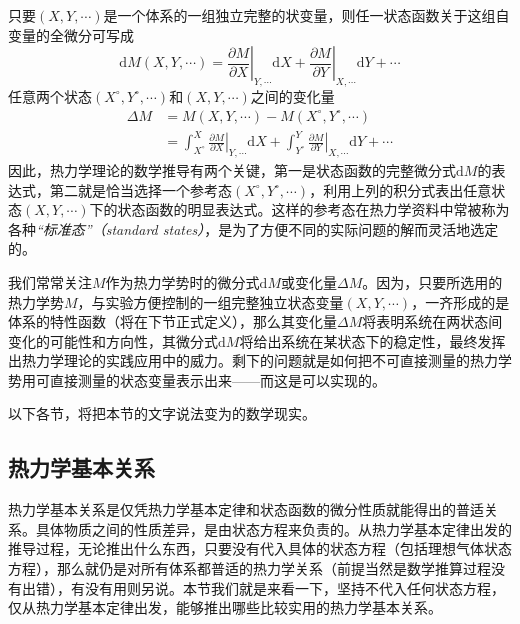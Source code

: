 \documentclass[main.tex]{subfiles}
\begin{document}
只要$\left(X,Y,\cdots\right)$是一个体系的一组独立完整的状变量，则任一状态函数关于这组自变量的全微分可写成
\[\mathrm{d}M\left(X,Y,\cdots\right)=\left.\frac{\partial M}{\partial X}\right|_{Y,\cdots}\mathrm{d}X+\left.\frac{\partial M}{\partial Y}\right|_{X,\cdots}\mathrm{d}Y+\cdots\]
任意两个状态$\left(X^\circ,Y^\circ,\cdots\right)$和$\left(X,Y,\cdots\right)$之间的变化量
\begin{equation}\label{eq:I.1_integral_of_function}
  \begin{aligned}
    \Delta M & =M\left(X,Y,\cdots\right)-M\left(X^\circ,Y^\circ,\cdots\right)                                                                                                                \\
             & =\int_{X^\circ}^{X}\left.\frac{\partial M}{\partial X}\right|_{Y,\cdots}\mathrm{d}X+\int_{Y^\circ}^{Y}\left.\frac{\partial M}{\partial Y}\right|_{X,\cdots}\mathrm{d}Y+\cdots
  \end{aligned}
\end{equation}
因此，热力学理论的数学推导有两个关键，第一是状态函数的完整微分式$\mathrm{d}M$的表达式，第二就是恰当选择一个参考态$\left(X^\circ,Y^\circ,\cdots\right)$，利用上列的积分式表出任意状态$\left(X,Y,\cdots\right)$下的状态函数的明显表达式。这样的参考态在热力学资料中常被称为各种\emph{“标准态”（standard states）}，是为了方便不同的实际问题的解而灵活地选定的。

我们常常关注$M$作为热力学势时的微分式$\mathrm{d}M$或变化量$\Delta M$。因为，只要所选用的热力学势$M$，与实验方便控制的一组完整独立状态变量$\left(X,Y,\cdots\right)$，一齐形成的是体系的特性函数（将在下节正式定义），那么其变化量$\Delta M$将表明系统在两状态间变化的可能性和方向性，其微分式$\mathrm{d}M$将给出系统在某状态下的稳定性，最终发挥出热力学理论的实践应用中的威力。剩下的问题就是如何把不可直接测量的热力学势用可直接测量的状态变量表示出来——而这是可以实现的。

以下各节，将把本节的文字说法变为的数学现实。

\subsection{热力学基本关系}
热力学基本关系是仅凭热力学基本定律和状态函数的微分性质就能得出的普适关系。具体物质之间的性质差异，是由状态方程来负责的。从热力学基本定律出发的推导过程，无论推出什么东西，只要没有代入具体的状态方程（包括理想气体状态方程），那么就仍是对所有体系都普适的热力学关系（前提当然是数学推算过程没有出错），有没有用则另说。本节我们就是来看一下，坚持不代入任何状态方程，仅从热力学基本定律出发，能够推出哪些比较实用的热力学基本关系。
\end{document}
